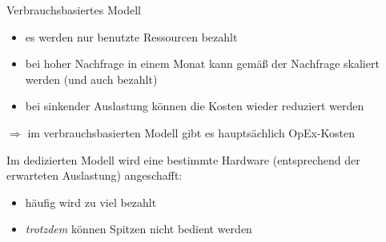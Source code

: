 \begin{flashcard}[Definition]{Verbrauchsbasiertes Modell}
        \begin{itemize}
            \item es werden nur benutzte Ressourcen bezahlt
            \item bei hoher Nachfrage in einem Monat kann gemäß der Nachfrage skaliert werden (und auch bezahlt)
            \item bei sinkender Auslastung können die Kosten wieder reduziert werden
        \end{itemize}
        $\Rightarrow$ im verbrauchsbasierten Modell gibt es hauptsächlich OpEx-Kosten

        \vspace{5mm}
        Im dedizierten Modell wird eine bestimmte Hardware (entsprechend der erwarteten Auslastung) angeschafft:
        \begin{itemize}
            \item häufig wird zu viel bezahlt
            \item \emph{trotzdem} können Spitzen nicht bedient werden
        \end{itemize}
\end{flashcard}
